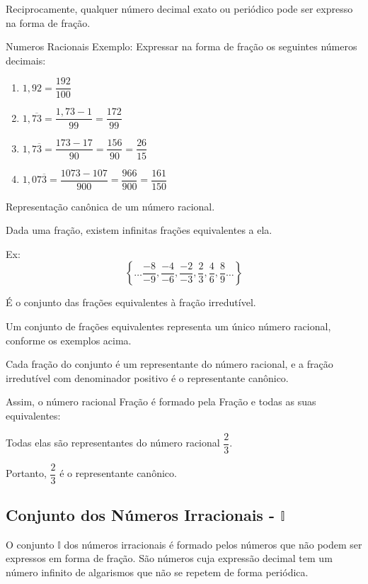\begin{multicols*}{2}
	Reciprocamente, qualquer número decimal exato ou periódico pode ser expresso na forma de fração.

	Numeros Racionais
	Exemplo:
	Expressar na forma de fração os seguintes números decimais:

	\begin{enumerate}
		\item $1,92 = \dfrac{192}{100}$\\
		\item $1,\overline{73} = \dfrac{1,73 - 1}{99} = \dfrac{172}{99}$\\
		\item $1,7\overline{3} =  \dfrac{173 - 17}{90} = \dfrac{156}{90} = \dfrac{26}{15}$\\
		\item $1,07\overline{3} = \dfrac{1073 - 107}{900}=  \dfrac{966}{900}  = \dfrac{161}{150}$
	\end{enumerate}

	Representação canônica de um número racional.

	Dada uma fração, existem infinitas frações equivalentes a ela.

	Ex:
	\[ \left\lbrace \dots \dfrac{-8}{-9}, \dfrac{-4}{-6}, \dfrac{-2}{-3}, \dfrac{2}{3}, \dfrac{4}{6},\dfrac{8}{9} \dots \right\rbrace \]

	É o conjunto das frações equivalentes à fração irredutível.

	Um conjunto de frações equivalentes representa um único número racional, conforme os exemplos acima.

	Cada fração do conjunto é um representante do número racional, e a fração irredutível com denominador positivo é o representante canônico.

	Assim, o número racional Fração é formado pela Fração e todas as suas equivalentes:

	Todas elas são representantes do número racional $\dfrac{2}{3} $.

	Portanto, $ \dfrac{2}{3} $ é o representante canônico.\\

	\subsection*{Conjunto dos Números Irracionais - $\mathbb{I}$}

	O conjunto $\mathbb{I}$ dos números irracionais é formado pelos números que não podem ser expressos em forma de fração. São números cuja expressão decimal tem um número infinito de algarismos que não se repetem de forma periódica.


\end{multicols*}
